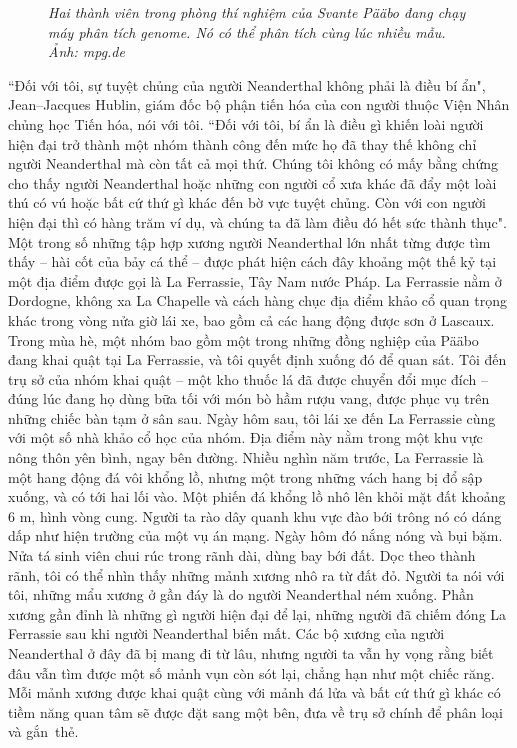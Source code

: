 \begin{multicols}{2}
\begin{figure}[H]
		\caption{\small\textit{\color{timhieukhoahoc}Hai thành viên trong phòng thí nghiệm của Svante Pääbo đang chạy máy phân tích genome. Nó có thể phân tích cùng lúc nhiều mẫu. Ảnh: mpg.de}}
		\vspace*{-10pt}
	\end{figure}
	``Đối với tôi, sự tuyệt chủng của người Neanderthal không phải là điều bí ẩn", Jean--Jacques Hublin, giám đốc bộ phận tiến hóa của con người thuộc Viện Nhân chủng học Tiến hóa, nói với tôi. ``Đối với tôi, bí ẩn là điều gì khiến loài người hiện đại trở thành một nhóm thành công đến mức họ đã thay thế không chỉ người Neanderthal mà còn tất cả mọi thứ. Chúng tôi không có mấy bằng chứng cho thấy người Neanderthal hoặc những con người cổ xưa khác đã đẩy một loài thú có vú hoặc bất cứ thứ gì khác đến bờ vực tuyệt chủng. Còn với con người hiện đại thì có hàng trăm ví dụ, và chúng ta đã làm điều đó hết sức thành thục".
	\vskip 0.1cm
	Một trong số những tập hợp xương người Neanderthal lớn nhất từng được tìm thấy -- hài cốt của bảy cá thể -- được phát hiện cách đây khoảng một thế kỷ tại một địa điểm được gọi là La Ferrassie, Tây Nam nước Pháp. La Ferrassie nằm ở Dordogne, không xa La Chapelle và cách hàng chục địa điểm khảo cổ quan trọng khác trong vòng nửa giờ lái xe, bao gồm cả các hang động được sơn ở Lascaux. Trong mùa hè, một nhóm bao gồm một trong những đồng nghiệp của Pääbo đang khai quật tại La Ferrassie, và tôi quyết định xuống đó để quan sát. Tôi đến trụ sở của nhóm khai quật -- một kho thuốc lá đã được chuyển đổi mục đích -- đúng lúc đang họ dùng bữa tối với món bò hầm rượu vang, được phục vụ trên những chiếc bàn tạm ở sân sau.
	\vskip 0.1cm
	Ngày hôm sau, tôi lái xe đến La Ferrassie cùng với một số nhà khảo cổ học của nhóm. Địa điểm này nằm trong một khu vực nông thôn yên bình, ngay bên đường. Nhiều nghìn năm trước, La Ferrassie là một hang động đá vôi khổng lồ, nhưng một trong những vách hang bị đổ sập xuống, và có tới hai lối vào. Một phiến đá khổng lồ nhô lên khỏi mặt đất khoảng $6$ m, hình vòng cung. Người ta rào dây quanh khu vực đào bới trông nó có dáng dấp như hiện trường của một vụ án mạng.
	\vskip 0.1cm
	Ngày hôm đó nắng nóng và bụi bặm. Nửa tá sinh viên chui rúc trong rãnh dài, dùng bay bới đất. Dọc theo thành rãnh, tôi có thể nhìn thấy những mảnh xương nhô ra từ đất đỏ. Người ta nói với tôi, những mẩu xương ở gần đáy là do người Neanderthal ném xuống. Phần xương gần đỉnh là những gì người hiện đại để lại, những người đã chiếm đóng La Ferrassie sau khi người Neanderthal biến mất. Các bộ xương của người Neanderthal ở đây đã bị mang đi từ lâu, nhưng người ta vẫn hy vọng rằng biết đâu vẫn tìm được một số mảnh vụn còn sót lại, chẳng hạn như một chiếc răng. Mỗi mảnh xương được khai quật cùng với mảnh đá lửa và bất cứ thứ gì khác có tiềm năng quan tâm sẽ được đặt sang một bên, đưa về trụ sở chính để phân loại và gắn~thẻ.

\end{multicols}
